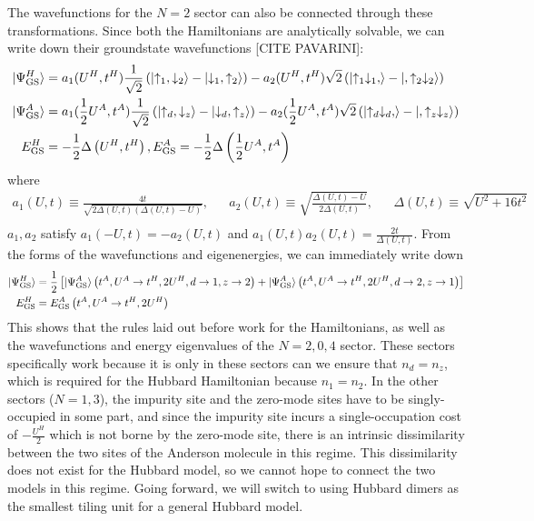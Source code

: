 \documentclass{report}
\numberwithin{equation}{section}
\begin{document}
The wavefunctions for the \(N=2\) sector can also be connected through these transformations. Since both the Hamiltonians are analytically solvable, we can write down their groundstate wavefunctions [CITE PAVARINI]:
\begin{equation}\begin{aligned}
	\ket{\Psi^H_\text{GS}} &= a_1(U^H, t^H)\frac{1}{\sqrt 2}\left(\ket{\uparrow_1, \downarrow_2} - \ket{\downarrow_1, \uparrow_2}\right) - a_2(U^H,t^H){\sqrt 2}\left(\ket{\uparrow_1\downarrow_1, } - \ket{,\uparrow_2\downarrow_2}\right)\\
	\ket{\Psi^A_\text{GS}} &= a_1(\frac{1}{2}U^A, t^A)\frac{1}{\sqrt 2}\left(\ket{\uparrow_d, \downarrow_z} - \ket{\downarrow_d, \uparrow_z}\right) - a_2(\frac{1}{2}U^A,t^A){\sqrt 2}\left(\ket{\uparrow_d\downarrow_d, } - \ket{,\uparrow_z\downarrow_z}\right)\\
	E^H_\text{GS} &=  -\frac{1}{2}\Delta\left( U^H, t^H \right), E^A_\text{GS} =  -\frac{1}{2}\Delta\left( \frac{1}{2}U^A, t^A \right)
\end{aligned}\end{equation}
where 
\begin{equation}\begin{aligned}
	a_1(U,t) \equiv \frac{4t}{\sqrt{2\Delta(U,t)\left( \Delta(U,t) - U \right) }}, && a_2(U,t) \equiv \sqrt{\frac{\Delta(U,t) - U}{2\Delta(U,t)}}, &&\Delta(U,t) \equiv \sqrt{U^2 + 16t^2}\\
\end{aligned}\end{equation}
$a_1,a_2$ satisfy $a_1(-U,t) = -a_2(U,t)$ and $a_1(U,t)a_2(U,t)= \frac{2t}{\Delta(U,t)}$.
From the forms of the wavefunctions and eigenenergies, we can immediately write down
\begin{equation}\begin{aligned}
	\ket{\Psi^H_\text{GS}} &= \frac{1}{2}\left[\ket{\Psi^A_\text{GS}}\left(t^A, U^A \to t^H, 2U^H, d \to 1, z \to 2\right) + \ket{\Psi^A_\text{GS}}\left(t^A, U^A \to t^H, 2U^H, d \to 2, z \to 1\right)\right]\\
	E^H_\text{GS} &= E^A_\text{GS}\left(t^A, U^A \to t^H, 2U^H\right)
\end{aligned}\end{equation}
This shows that the rules laid out before work for the Hamiltonians, as well as the wavefunctions and energy eigenvalues of the \(N=2,0,4\) sector. These sectors specifically work because it is only in these sectors can we ensure that \(n_d = n_z\), which is required for the Hubbard Hamiltonian because \(n_1 = n_2\). In the other sectors (\(N=1,3\)), the impurity site and the zero-mode sites have to be singly-occupied in some part, and since the impurity site incurs a single-occupation cost of \(-\frac{U^H}{2}\) which is not borne by the zero-mode site, there is an intrinsic dissimilarity between the two sites of the Anderson molecule in this regime. This dissimilarity does not exist for the Hubbard model, so we cannot hope to connect the two models in this regime. Going forward, we will switch to using Hubbard dimers as the smallest tiling unit for a general Hubbard model.
\end{document}
